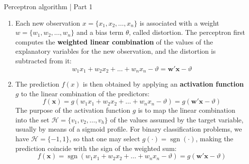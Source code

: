 \begin{tcolorbox} [colback=blue!5, colframe=blue!80, boxrule=0pt]
    \begin{algorithm} [H]
        \caption{Perceptron algorithm | Part 1}
        \label{alg: Rosenblatt perceptron}
        \begin{enumerate}
            \item Each new observation $x = \{x_1, x_2, \dots, x_n\}$ is associated with a weight $w = \{w_1, w_2, \dots, w_n\}$ and a bias term $\theta$, called distortion. The perceptron first computes the \textbf{weighted linear combination} of the values of the explanatory variables for the new observation, and the distortion is subtracted from it:
            \[
            w_1 x_1 + w_2 x_2 + \dots + w_n x_n - \vartheta = \mathbf{w}' \mathbf{x} - \vartheta
            \]
            
            \item The prediction $f(x)$ is then obtained by applying an \textbf{activation function} $g$ to the linear combination of the predictors:
            \[
            f(\mathbf{x}) = g(w_1 x_1 + w_2 x_2 + \dots + w_n x_n - \vartheta) = g(\mathbf{w}' \mathbf{x} - \vartheta)
            \]
            The purpose of the activation function $g$ is to map the linear combination into the set $\mathcal{H} = \{v_1, v_2, \dots, v_h\}$ of the values assumed by the target variable, usually by means of a sigmoid profile. For binary classification problems, we have $\mathcal{H} = \{-1, 1\}$, so that one may select $g(\cdot) = \operatorname{sgn}(\cdot)$, making the prediction coincide with the sign of the weighted sum:
            \[
            f(\mathbf{x}) = \operatorname{sgn}(w_1 x_1 + w_2 x_2 + \dots + w_n x_n - \vartheta) = g(\mathbf{w}' \mathbf{x} - \vartheta)
            \]
        \end{enumerate}
    \end{algorithm}
\end{tcolorbox}    

\newpage
    
